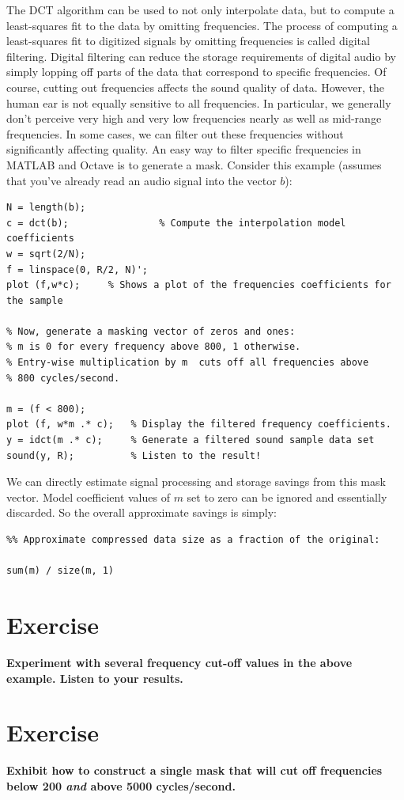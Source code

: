 \documentclass[10pt]{article}
\begin{document}
The DCT algorithm can be used to not only interpolate data, but to compute a
least-squares fit to the data by omitting frequencies.  The process of
computing a least-squares fit to digitized signals by omitting frequencies is
called digital filtering.  Digital filtering can reduce the storage
requirements of digital audio by simply lopping off parts of the data that
correspond to specific frequencies.  Of course, cutting out frequencies affects
the sound quality of data.  However, the human ear is not equally sensitive to
all frequencies.  In particular, we generally don't perceive very high and very
low frequencies nearly as well as mid-range frequencies.  In some cases, we can
filter out these frequencies without significantly affecting quality.  An easy
way to filter specific frequencies in MATLAB and Octave is to generate a mask.
Consider this example (assumes that you've already read  an audio signal into
the vector $b$):
\begin{verbatim}
N = length(b);
c = dct(b);                % Compute the interpolation model coefficients
w = sqrt(2/N);
f = linspace(0, R/2, N)';
plot (f,w*c);     % Shows a plot of the frequencies coefficients for the sample

% Now, generate a masking vector of zeros and ones:
% m is 0 for every frequency above 800, 1 otherwise.
% Entry-wise multiplication by m  cuts off all frequencies above
% 800 cycles/second.

m = (f < 800);
plot (f, w*m .* c);   % Display the filtered frequency coefficients.
y = idct(m .* c);     % Generate a filtered sound sample data set
sound(y, R);          % Listen to the result!
\end{verbatim}

We can directly estimate signal processing and storage savings from this mask
vector. Model coefficient values of $m$ set to zero can be ignored and essentially
discarded. So the overall approximate savings is simply:
\begin{verbatim}
%% Approximate compressed data size as a fraction of the original:

sum(m) / size(m, 1)
\end{verbatim}


\section*{Exercise}
{\bf Experiment with several frequency cut-off values in the above example.
Listen to your results. }

\section*{Exercise}
{\bf Exhibit how to construct a single mask that will
cut off frequencies below 200 {\it and} above 5000 cycles/second. }
\end{document}
